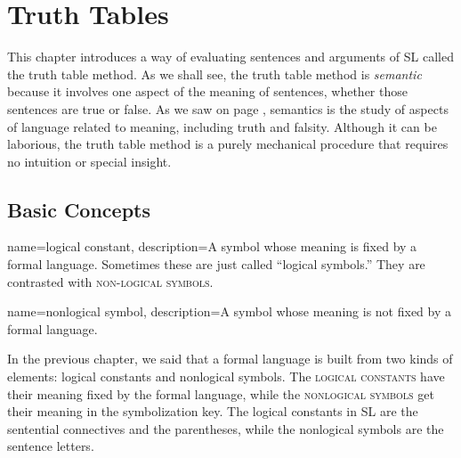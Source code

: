 \chapter{Truth Tables}
\label{chap:truth_tables}


This chapter introduces a way of evaluating sentences and arguments of SL called the truth table method. As we shall see, the truth table method is \emph{semantic} because it involves one aspect of the meaning of sentences, whether those sentences are true or false. As we saw on page \pageref{def:semantics}, semantics is the study of aspects of language related to meaning, including truth and falsity. Although it can be laborious, the truth table method is a purely mechanical procedure that requires no intuition or special insight. 



\section{Basic Concepts}

{
name=logical constant,
description={A symbol whose meaning is fixed by a formal language. Sometimes these are just called ``logical symbols.'' They are contrasted with \textsc{non-logical symbols}.}
}

{
name=nonlogical symbol,
description={A symbol whose meaning is not fixed by a formal language.}
}



In the previous chapter, we said that a formal language is built from two kinds of elements: logical constants and nonlogical symbols. The \textsc{\glspl{logical constant}}\label{def:logical_constant} have their meaning fixed by the formal language, while the \textsc{\glspl{nonlogical symbol}} \label{def:nonlogical_symbol} get their meaning in the symbolization key. The logical constants in SL are the sentential connectives and the parentheses, while the nonlogical symbols are the sentence letters. 

